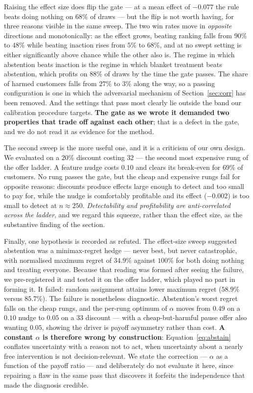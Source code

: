 \documentclass[11pt,a4paper]{article}
\begin{document}
Raising the effect size does flip the gate --- at a mean effect of $-0.077$ the rule
beats doing nothing on $68\%$ of draws --- but the flip is not worth having, for three
reasons visible in the same sweep. The two win rates move in \emph{opposite} directions
and monotonically: as the effect grows, beating ranking falls from $90\%$ to $48\%$
while beating inaction rises from $5\%$ to $68\%$, and at no swept setting is either
significantly above chance while the other also is. The regime in which abstention beats
inaction is the regime in which blanket treatment beats abstention, which profits on
$88\%$ of draws by the time the gate passes. The share of
harmed customers falls from $27\%$ to $3\%$ along the way, so a passing configuration is
one in which the adversarial mechanism of Section~\ref{sec:corr} has been removed. And
the settings that pass most clearly lie outside the band our calibration procedure
targets. \textbf{The gate as we wrote it demanded two properties that trade off against
each other}; that is a defect in the gate, and we do not read it as evidence for the
method.

The second sweep is the more useful one, and it is a criticism of our own design. We
evaluated on a $20\%$ discount costing $32$ --- the second most expensive rung of the
offer ladder. A feature nudge costs $0.10$ and clears its break-even for $69\%$ of
customers. No rung passes the gate, but the cheap and expensive rungs fail for opposite
reasons: discounts produce effects large enough to detect and too small to pay for,
while the nudge is comfortably profitable and its effect ($-0.002$) is too small to
detect at $n \approx 250$. \emph{Detectability and profitability are anti-correlated
across the ladder}, and we regard this squeeze, rather than the effect size, as the
substantive finding of the section.

Finally, one hypothesis is recorded as refuted. The effect-size sweep suggested
abstention was a minimax-regret hedge --- never best, but never catastrophic, with
normalised maximum regret of $34.9\%$ against $100\%$ for both doing nothing and
treating everyone. Because that reading was formed after seeing the failure, we
pre-registered it and tested it on the offer ladder, which played no part in forming it.
It failed: random assignment attains lower maximum regret ($58.9\%$ versus $85.7\%$).
The failure is nonetheless diagnostic. Abstention's worst regret falls on the cheap
rungs, and the per-rung optimum of $\alpha$ moves from $0.49$ on a $0.10$ nudge to
$0.05$ on a $33$ discount --- with a cheap-but-harmful pause offer also wanting $0.05$,
showing the driver is payoff asymmetry rather than cost. \textbf{A constant $\alpha$ is
therefore wrong by construction}: Equation~\ref{eq:abstain} conflates uncertainty with a
reason not to act, when uncertainty about a nearly free intervention is not
decision-relevant. We state the correction --- $\alpha$ as a function of the payoff ratio
--- and deliberately do not evaluate it here, since repairing a flaw in the same pass
that discovers it forfeits the independence that made the diagnosis credible.
\end{document}
